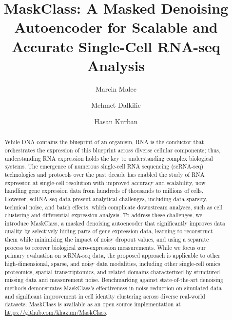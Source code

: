 \documentclass[sigconf,review]{acmart}
\theoremstyle{plain}
\theoremstyle{definition}
\theoremstyle{remark}
\newcommand{\maskclassrepolink}{%
  \url{https://github.com/khazum/MaskClass}}
\begin{document}
\raggedbottom

\title{MaskClass: A Masked Denoising Autoencoder for Scalable and Accurate Single-Cell RNA-seq Analysis}

\author{Marcin Malec}

\author{Mehmet Dalkilic}

\author{Hasan Kurban}

\renewcommand{\shortauthors}{Malec et al.}

\begin{abstract}
While DNA contains the blueprint of an organism, RNA is the conductor that orchestrates the expression of this blueprint across diverse cellular components; thus, understanding RNA expression holds the key to understanding complex biological systems. The emergence of numerous single-cell RNA sequencing (scRNA-seq) technologies and protocols over the past decade has enabled the study of RNA expression at single-cell resolution with improved accuracy and scalability, now handling gene expression data from hundreds of thousands to millions of cells. However, scRNA-seq data present analytical challenges, including data sparsity, technical noise, and batch effects, which complicate downstream analyses, such as cell clustering and differential expression analysis. To address these challenges, we introduce MaskClass, a masked denoising autoencoder that significantly improves data quality by selectively hiding parts of gene expression data, learning to reconstruct them while minimizing the impact of noisy dropout values, and using a separate process to recover biological zero-expression measurements. While we focus our primary evaluation on scRNA-seq data, the proposed approach is applicable to other high-dimensional, sparse, and noisy data modalities, including other single-cell omics proteomics, spatial transcriptomics, and related domains characterized by structured missing data and measurement noise. Benchmarking against state-of-the-art denoising methods demonstrates MaskClass's effectiveness in noise reduction on simulated data and significant improvement in cell identity clustering across diverse real-world datasets. MaskClass is available as an open source implementation at \maskclassrepolink.
\end{abstract}
\end{document}
